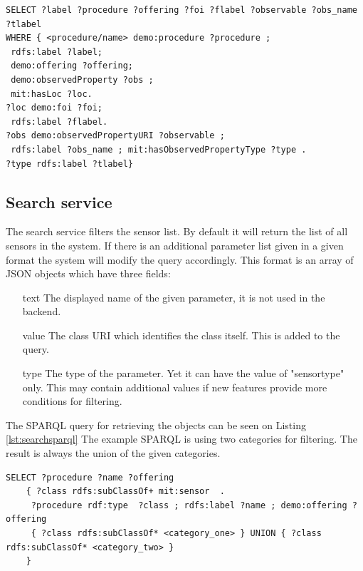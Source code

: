 \begin{lstlisting}[caption={SPARQL query for Capabilities\label{lst:capsparql}}]
SELECT ?label ?procedure ?offering ?foi ?flabel ?observable ?obs_name ?tlabel 
WHERE { <procedure/name> demo:procedure ?procedure ;
 rdfs:label ?label;
 demo:offering ?offering;
 demo:observedProperty ?obs ; 
 mit:hasLoc ?loc.
?loc demo:foi ?foi;
 rdfs:label ?flabel. 
?obs demo:observedPropertyURI ?observable ;
 rdfs:label ?obs_name ; mit:hasObservedPropertyType ?type .
?type rdfs:label ?tlabel}
\end{lstlisting}

\subsection{Search service}
The search service filters the sensor list. By default it will return the list of all sensors in the system. If there is an additional parameter list given in a given format the system will modify the query accordingly. This format is an array of JSON objects which have three fields: 
\begin{itemize}
\item[text] The displayed name of the given parameter, it is not used in the backend.
\item[value] The class URI which identifies the class itself. This is added to the query.
\item[type] The type of the parameter. Yet it can have the value of "sensortype" only. This may contain additional values if new features provide more conditions for filtering. 
\end{itemize}
The SPARQL query for retrieving the objects can be seen on Listing \ref{lst:searchsparql} The example SPARQL is using two categories for filtering. The result is always the union of the given categories. 

\begin{lstlisting}[caption={SPARQL query for Search\label{lst:searchsparql}}]
SELECT ?procedure ?name ?offering
    { ?class rdfs:subClassOf+ mit:sensor  .
     ?procedure rdf:type  ?class ; rdfs:label ?name ; demo:offering ?offering 
     { ?class rdfs:subClassOf* <category_one> } UNION { ?class rdfs:subClassOf* <category_two> }
    }
\end{lstlisting}


